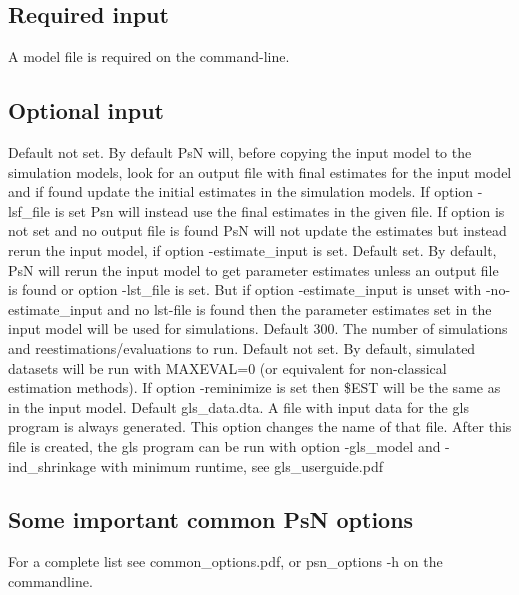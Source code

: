 \subsection{Required input}

A model file is required on the command-line.

\subsection{Optional input}

\begin{optionlist}
Default not set. By default PsN will, before copying the input model to the simulation models, look for an output file with final estimates for the input model and if found update the initial estimates in the simulation models. If option -lsf\_file is set Psn will instead use the final estimates in the given file. If option is not set and no output file is found PsN will not update the estimates but instead rerun the input model, if option -estimate\_input is set. 
\nextopt
{}
Default set. By default, PsN will rerun the input model to get parameter estimates unless an output file is found or option -lst\_file is set. But if option -estimate\_input is unset with -no-estimate\_input and no lst-file is found then the parameter estimates set in the input model will be used for simulations. 
\nextopt
{}
Default 300. The number of simulations and reestimations/evaluations to run. 
\nextopt
{}
Default not set. By default, simulated datasets will be run with MAXEVAL=0 (or equivalent for non-classical estimation methods). If option -reminimize is set then \$EST will be the same as in the input model. 
\nextopt
{}
Default gls\_data.dta. A file with input data for the gls program is always generated. This option changes the name of that file. After this file is created, the gls program can be run with option \mbox{-gls\_model} and -ind\_shrinkage with minimum runtime, see gls\_userguide.pdf 
\nextopt
\end{optionlist}

\subsection{Some important common PsN options}
For a complete list see common\_options.pdf, 
or psn\_options -h on the commandline.


